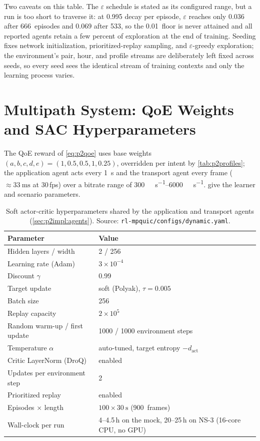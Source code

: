 Two caveats on this table. The $\varepsilon$ schedule is stated as its configured range, but a run is too
short to traverse it: at 0.995 decay per episode, $\varepsilon$ reaches only 0.036 after 666~episodes and
0.069 after 533, so the 0.01~floor is never attained and all reported agents retain a few percent of
exploration at the end of training. Seeding fixes network initialization, prioritized-replay sampling,
and $\varepsilon$-greedy exploration; the environment's pair, hour, and profile streams are deliberately
left fixed across seeds, so every seed sees the identical stream of training contexts and only the
learning process varies.

\section{Multipath System: QoE Weights and SAC Hyperparameters}
\label{app:p2hyper}

The QoE reward of \cref{eq:p2qoe} uses base weights $(a,b,c,d,e) = (1, 0.5, 0.5, 1, 0.25)$, overridden
per intent by \cref{tab:p2profiles}; the application agent acts every \SI{1}{\second} and the transport
agent every frame (${\approx}\SI{33}{\milli\second}$ at 30\,fps) over a bitrate range of
\SIrange{300}{6000}{\kilo\bit\per\second}.  give the learner and
scenario parameters.

\begin{table}[h]
  \centering
  \caption[Soft actor-critic hyperparameters, multipath system]{Soft actor-critic hyperparameters shared by the application and transport agents
  (\cref{sec:p2impl:agents}). Source: \texttt{rl-mpquic/configs/dynamic.yaml}.}
  \label{tab:app:p2hyper}
  \begin{tabular}{ll}
    \toprule
    Parameter & Value \\
    \midrule
    Hidden layers / width       & 2 / 256 \\
    Learning rate (Adam)        & $3\times10^{-4}$ \\
    Discount $\gamma$           & 0.99 \\
    Target update               & soft (Polyak), $\tau = 0.005$ \\
    Batch size                  & 256 \\
    Replay capacity             & $2\times10^{5}$ \\
    Random warm-up / first update & 1000 / 1000 environment steps \\
    Temperature $\alpha$        & auto-tuned, target entropy $-d_{\mathrm{act}}$ \\
    Critic LayerNorm (DroQ)     & enabled \\
    Updates per environment step & 2 \\
    Prioritized replay          & enabled \\
    Episodes $\times$ length    & $100 \times \SI{30}{\second}$ (900~frames) \\
    Wall-clock per run          & 4--4.5\,h on the mock, 20--25\,h on NS-3 (16-core CPU, no GPU) \\
    \bottomrule
  \end{tabular}
\end{table}

